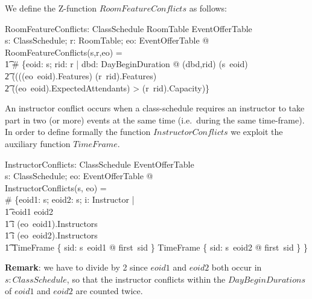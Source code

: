 \documentclass[a4paper]{article}
\begin{document}

We define the Z-function $RoomFeatureConflicts$ as follows:
\begin{axdef}
  RoomFeatureConflicts: ClassSchedule \cross RoomTable \cross EventOfferTable
  \fun \nat \\
  \where
  \forall s: ClassSchedule; r: RoomTable; eo: EventOfferTable @ \\
  RoomFeatureConflicts(s,r,eo) = \\
  \t1 \# \{eoid: \dom s; rid: \dom r | \exists dbd: DayBeginDuration @ (dbd,rid)
  \in (s~eoid) \land \\
  \t2 (\lnot(((eo~eoid).Features) \subseteq (r~rid).Features) \\
  \t2 \lor ((eo~eoid).ExpectedAttendants) > (r~rid).Capacity)\} \\
\end{axdef}

\noindent
An instructor conflict occurs when a class-schedule requires an instructor to
take part in two (or more) events at the same time (i.e.~during the same
time-frame). In order to define formally the function $InstructorConflicts$ we
exploit the auxiliary function $TimeFrame$.
\begin{axdef}
  InstructorConflicts: ClassSchedule \cross EventOfferTable \fun \nat \\
  \where
  \forall s: ClassSchedule; eo: EventOfferTable @ \\
  InstructorConflicts(s, eo) = \\
  \# \{eoid1: \dom s; eoid2: \dom s; i: Instructor | \\
  \t1 eoid1 \neq eoid2 \\
  \t1 \land i \in (eo~eoid1).Instructors \\
  \t1 \land i \in (eo~eoid2).Instructors \\
  \t1 \land TimeFrame \{ sid: s~eoid1 @ first~sid \} \cap TimeFrame \{ sid:
  s~eoid2 @ first~sid \} \neq \emptyset \}  \\
\end{axdef}

\noindent
{\bf Remark}: we have to divide by 2 since $eoid1$ and $eoid2$ both occur in $s:
ClassSchedule$, so that the instructor conflicts within the $DayBeginDurations$
of $eoid1$ and $eoid2$ are counted twice.
\end{document}
